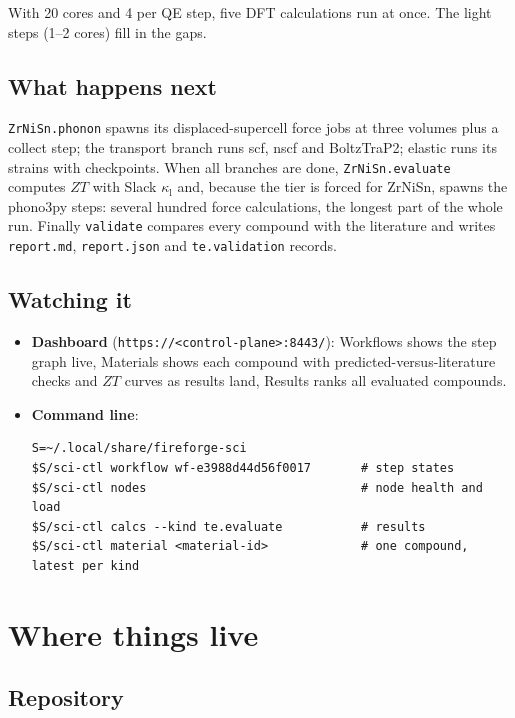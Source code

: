 \documentclass[11pt,a4paper]{report}
\newcommand{\code}[1]{\texttt{#1}}
\newcommand{\kl}{\kappa_\mathrm{l}}
\begin{document}
With 20 cores and 4 per QE step, five DFT calculations run at once. The light steps (1--2
cores) fill in the gaps.

\section{What happens next}

\code{ZrNiSn.phonon} spawns its displaced-supercell force jobs at three volumes plus a collect
step; the transport branch runs scf, nscf and BoltzTraP2; elastic runs its strains with
checkpoints. When all branches are done, \code{ZrNiSn.evaluate} computes $ZT$ with Slack $\kl$ and,
because the tier is forced for ZrNiSn, spawns the phono3py steps: several hundred force
calculations, the longest part of the whole run. Finally \code{validate} compares every compound
with the literature and writes \code{report.md}, \code{report.json} and \code{te.validation}
records.

\section{Watching it}

\begin{itemize}
\item \textbf{Dashboard} (\code{https://<control-plane>:8443/}): Workflows shows the step graph live,
  Materials shows each compound with predicted-versus-literature checks and $ZT$ curves as results
  land, Results ranks all evaluated compounds.
\item \textbf{Command line}:
\begin{lstlisting}
S=~/.local/share/fireforge-sci
$S/sci-ctl workflow wf-e3988d44d56f0017       # step states
$S/sci-ctl nodes                              # node health and load
$S/sci-ctl calcs --kind te.evaluate           # results
$S/sci-ctl material <material-id>             # one compound, latest per kind
\end{lstlisting}
\end{itemize}

\chapter{Where things live}

\section{Repository}
\end{document}
